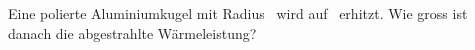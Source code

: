Eine polierte Aluminiumkugel mit Radius \rKO\ wird auf \tKO\ erhitzt. Wie gross ist danach die abgestrahlte Wärmeleistung?
